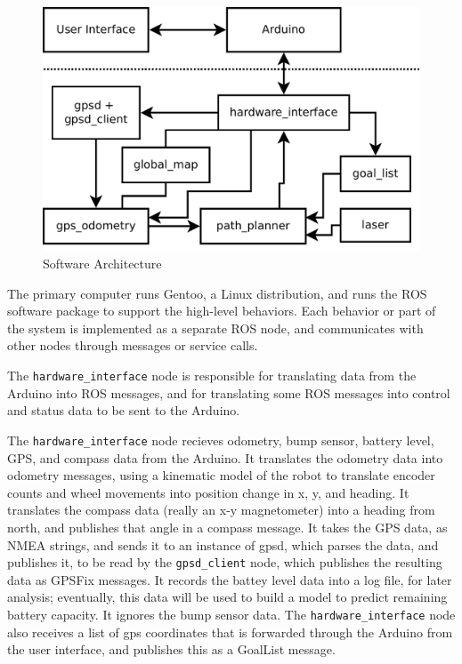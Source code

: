 
\begin{figure}
\includegraphics[width=1\textwidth]{software_flow}
\caption{Software Architecture}
\end{figure}

The primary computer runs Gentoo, a Linux distribution, and runs the ROS software package to support the high-level behaviors. Each behavior or part of the system is implemented as a separate ROS node, and communicates with other nodes through messages or service calls.

The \texttt{hardware\_interface} node is responsible for translating data from the Arduino into ROS messages, and for translating some ROS messages into control and status data to be sent to the Arduino. 

The \texttt{hardware\_interface} node recieves odometry, bump sensor, battery level, GPS, and compass data from the Arduino. It translates the odometry data into odometry messages, using a kinematic model of the robot to translate encoder counts and wheel movements into position change in x, y, and heading. It translates the compass data (really an x-y magnetometer) into a heading from north, and publishes that angle in a compass message. It takes the GPS data, as NMEA strings, and sends it to an instance of gpsd\cite{gpsd}, which parses the data, and publishes it, to be read by the \texttt{gpsd\_client} node, which publishes the resulting data as GPSFix messages. It records the battey level data into a log file, for later analysis; eventually, this data will be used to build a model to predict remaining battery capacity. It ignores the bump sensor data. The \texttt{hardware\_interface} node also receives a list of gps coordinates that is forwarded through the Arduino from the user interface, and publishes this as a GoalList message.

